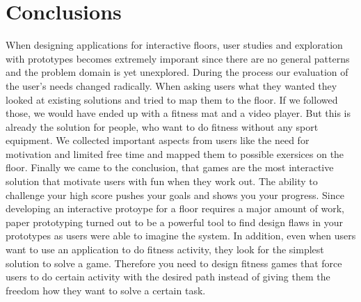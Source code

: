 \documentclass[twocolumn,showpacs,%
  nofootinbib,aps,superscriptaddress,%
  eqsecnum,prd,notitlepage,showkeys,10pt]{revtex4-1}
\begin{document}
\section{Conclusions}
When designing applications for interactive floors, user studies and exploration with prototypes becomes extremely imporant since there are no general patterns and the problem domain is yet unexplored. During the process our evaluation of the user's needs changed radically. When asking users what they wanted they looked at existing solutions and tried to map them to the floor. If we followed those, we would have ended up with a fitness mat and a video player. But this is already the solution for people, who want to do fitness without any sport equipment. We collected important aspects from users like the   need for motivation and limited free time and mapped them to possible exersices on the floor. Finally we came to the conclusion, that games are the most interactive solution that motivate users with fun when they work out. The ability to challenge your high score pushes your goals and shows you your progress.
Since developing an interactive protoype for a floor requires a major amount of work, paper prototyping turned out to be a powerful tool to find design flaws in your prototypes as users were able to imagine the system.
In addition, even when users want to use an application to do fitness activity, they look for the simplest solution to solve a game. Therefore you need to design fitness games that force users to do certain activity with the desired path instead of giving them the freedom how they want to solve a certain task.
\end{document}
